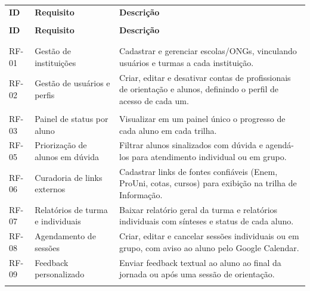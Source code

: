{\ABNTEXfontereduzida
\renewcommand{\arraystretch}{1.25}
\begin{xltabular}{\textwidth}{|>{\centering\arraybackslash}p{1.2cm}|>{\raggedright\arraybackslash}p{3.6cm}|>{\raggedright\arraybackslash}X|}
 \\[0.3em]
\hline
\textbf{ID} & \textbf{Requisito} & \textbf{Descrição} \\
\hline
\endfirsthead
{} \\
\hline
\textbf{ID} & \textbf{Requisito} & \textbf{Descrição} \\
\hline
\endhead
{} \\
\endfoot
\endlastfoot
{} \\
\hline
RF-01 & Gestão de instituições & Cadastrar e gerenciar escolas/ONGs, vinculando usuários e turmas a cada instituição. \\
\hline
RF-02 & Gestão de usuários e perfis & Criar, editar e desativar contas de profissionais de orientação e alunos, definindo o perfil de acesso de cada um. \\
\hline
{} \\
\hline
RF-03 & Painel de status por aluno & Visualizar em um painel único o progresso de cada aluno em cada trilha. \\
\hline
RF-05 & Priorização de alunos em dúvida & Filtrar alunos sinalizados com dúvida e agendá-los para atendimento individual ou em grupo. \\
\hline
RF-06 & Curadoria de links externos & Cadastrar links de fontes confiáveis (Enem, ProUni, cotas, cursos) para exibição na trilha de Informação. \\
\hline
RF-07 & Relatórios de turma e individuais & Baixar relatório geral da turma e relatórios individuais com sínteses e status de cada aluno. \\
\hline
RF-08 & Agendamento de sessões & Criar, editar e cancelar sessões individuais ou em grupo, com aviso ao aluno pelo Google Calendar. \\
\hline
RF-09 & Feedback personalizado & Enviar feedback textual ao aluno ao final da jornada ou após uma sessão de orientação. \\
\hline
{} \\

\end{xltabular}}
